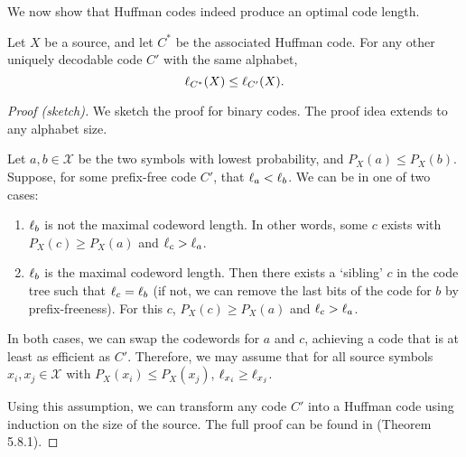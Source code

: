 We now show that Huffman codes indeed produce an optimal code length.

\begin{theorem}
Let $X$ be a source, and let $C^*$ be the associated Huffman code. For any other uniquely decodable code $C'$ with the same alphabet,
\[
\ell_{C^*}(X) \leq \ell_{C'}(X).
\]
\end{theorem}
\begin{proof}[Proof (sketch)]
We sketch the proof for binary codes. The proof idea extends to any alphabet size.

Let $a,b \in \mathcal{X}$ be the two symbols with lowest probability, and $P_X(a) \leq P_X(b)$. Suppose, for some prefix-free code $C'$, that $\ell_a < \ell_b$. We can be in one of two cases:
\begin{enumerate}
\item $\ell_b$ is not the maximal codeword length. In other words, some $c$ exists with $P_X(c) \geq P_X(a)$ and $\ell_c > \ell_a$.
\item $\ell_b$ is the maximal codeword length. Then there exists a `sibling' $c$ in the code tree such that $\ell_c = \ell_b$ (if not, we can remove the last bits of the code for $b$ by prefix-freeness). For this $c$, $P_X(c) \geq P_X(a)$ and $\ell_c > \ell_a$.
\end{enumerate}
In both cases, we can swap the codewords for $a$ and $c$, achieving a code that is at least as efficient as $C'$. Therefore, we may assume that for all source symbols $x_i, x_j \in \mathcal{X}$ with $P_X(x_i) \leq P_X(x_j)$, $\ell_{x_i} \geq \ell_{x_j}$.

Using this assumption, we can transform any code $C'$ into a Huffman code using induction on the size of the source. The full proof can be found in \CT{} (Theorem 5.8.1).
\end{proof}

